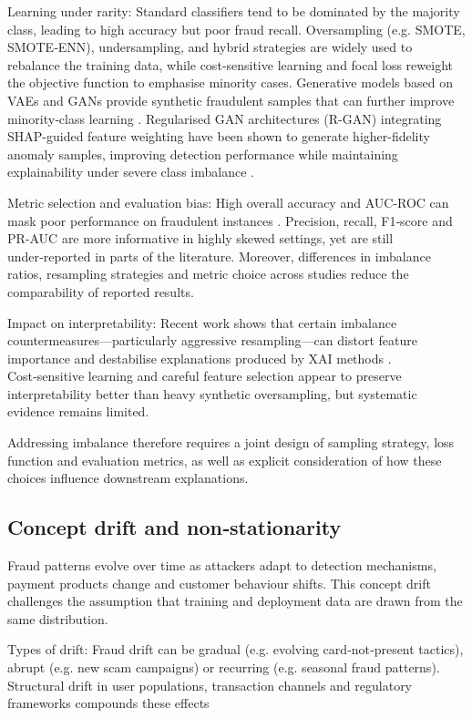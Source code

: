 \documentclass[a4paper,fleqn]{cas-dc}
\begin{document}
Learning under rarity: Standard classifiers tend to be dominated by the majority class, leading to high accuracy but poor fraud recall. 
Oversampling (e.g. SMOTE, SMOTE‑ENN), undersampling, and hybrid strategies are widely used to rebalance the training data, while cost‑sensitive learning and focal loss reweight the objective function to emphasise minority cases. 
Generative models based on VAEs and GANs provide synthetic fraudulent samples that can further improve minority‑class learning \cite{hu_hybrid_2025}.
Regularised GAN architectures (R-GAN) integrating SHAP-guided feature weighting have been shown to generate higher-fidelity anomaly samples, improving detection performance while maintaining explainability under severe class imbalance \cite{lee_advanced_2025}.

Metric selection and evaluation bias: High overall accuracy and AUC‑ROC can mask poor performance on fraudulent instances \cite{sivasubramanian_predicting_2024}. 
Precision, recall, F1‑score and PR‑AUC are more informative in highly skewed settings, yet are still under‑reported in parts of the literature. 
Moreover, differences in imbalance ratios, resampling strategies and metric choice across studies reduce the comparability of reported results.

Impact on interpretability: Recent work shows that certain imbalance countermeasures—particularly aggressive resampling—can distort feature importance and destabilise explanations produced by XAI methods \cite{lalit_imbalance_2025}. 
Cost‑sensitive learning and careful feature selection appear to preserve interpretability better than heavy synthetic oversampling, but systematic evidence remains limited.

Addressing imbalance therefore requires a joint design of sampling strategy, loss function and evaluation metrics, as well as explicit consideration of how these choices influence downstream explanations.

\subsection{Concept drift and non‑stationarity}
Fraud patterns evolve over time as attackers adapt to detection mechanisms, payment products change and customer behaviour shifts. 
This concept drift challenges the assumption that training and deployment data are drawn from the same distribution.

Types of drift: Fraud drift can be gradual (e.g. evolving card‑not‑present tactics), abrupt (e.g. new scam campaigns) or recurring (e.g. seasonal fraud patterns). 
Structural drift in user populations, transaction channels and regulatory frameworks compounds these effects
\end{document}
